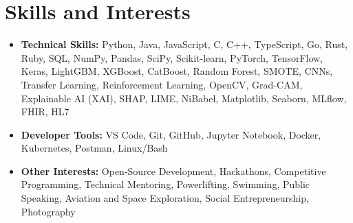 \documentclass[letterpaper,10.8pt]{article}
\newcommand{\resumeItem}[2]{
  \item\small{
    \textbf{#1}{ #2 }
  }
}
\newcommand{\resumeSubItem}[2]{\resumeItem{#1}{#2}}
\begin{document}
\section{Skills and Interests}
	\begin{itemize}[leftmargin=*, itemsep=1pt, label={$\bullet$}]
	\resumeSubItem{Technical Skills:}{Python, Java, JavaScript, C, C++, TypeScript, Go, Rust, Ruby, SQL, NumPy, Pandas, SciPy, Scikit-learn, PyTorch, TensorFlow, Keras, LightGBM, XGBoost, CatBoost, Random Forest, SMOTE, CNNs, Transfer Learning, Reinforcement Learning, OpenCV, Grad-CAM, Explainable AI (XAI), SHAP, LIME, NiBabel, Matplotlib, Seaborn, MLflow, FHIR, HL7}
	\resumeSubItem{Developer Tools:}{VS Code, Git, GitHub, Jupyter Notebook, Docker, Kubernetes, Postman, Linux/Bash}
	\resumeSubItem{Other Interests:}{Open-Source Development, Hackathons, Competitive Programming, Technical Mentoring, Powerlifting, Swimming, Public Speaking, Aviation and Space Exploration, Social Entrepreneurship, Photography}
\end{itemize}
\end{document}
